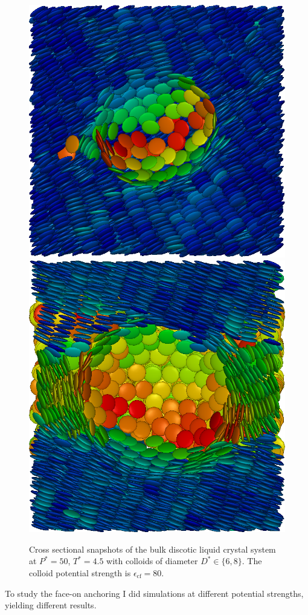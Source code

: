 \begin{figure}[H]
 \centering
 \includegraphics[width=.4\linewidth]{images/bfo_C80_D6.png}
 \qquad
 \includegraphics[width=.4\linewidth]{images/bfo_C80_D8.png}
\caption{Cross sectional snapshots of the bulk discotic liquid crystal system at $P^* = 50$, $T^* = 4.5$ with colloids of diameter $D^* \in \{6,8\} $. The colloid potential strength is $\epsilon_{\text{cf}}= 80$. }
 \label{fig:bfosnapshots}
\end{figure}

To study the face-on anchoring I did simulations at different potential strengths, yielding different results.

